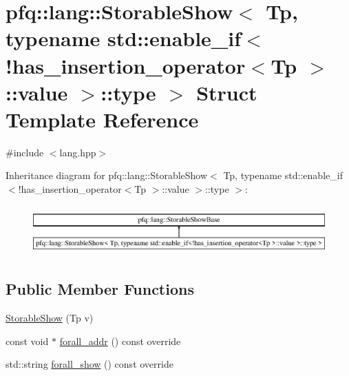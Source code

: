 \hypertarget{structpfq_1_1lang_1_1StorableShow_3_01Tp_00_01typename_01std_1_1enable__if_3_9has__insertion__op9c58e317fa180887b2f1b929c60377c7}{\section{pfq\+:\+:lang\+:\+:Storable\+Show$<$ Tp, typename std\+:\+:enable\+\_\+if$<$!has\+\_\+insertion\+\_\+operator$<$Tp $>$\+:\+:value $>$\+:\+:type $>$ Struct Template Reference}
\label{structpfq_1_1lang_1_1StorableShow_3_01Tp_00_01typename_01std_1_1enable__if_3_9has__insertion__op9c58e317fa180887b2f1b929c60377c7}
}


{\ttfamily \#include $<$lang.\+hpp$>$}

Inheritance diagram for pfq\+:\+:lang\+:\+:Storable\+Show$<$ Tp, typename std\+:\+:enable\+\_\+if$<$!has\+\_\+insertion\+\_\+operator$<$Tp $>$\+:\+:value $>$\+:\+:type $>$\+:\begin{figure}[H]
\begin{center}
\leavevmode
\includegraphics[height=1.921098cm]{structpfq_1_1lang_1_1StorableShow_3_01Tp_00_01typename_01std_1_1enable__if_3_9has__insertion__op9c58e317fa180887b2f1b929c60377c7}
\end{center}
\end{figure}
\subsection*{Public Member Functions}
\begin{DoxyCompactItemize}
\item 
\hyperlink{structpfq_1_1lang_1_1StorableShow_3_01Tp_00_01typename_01std_1_1enable__if_3_9has__insertion__op9c58e317fa180887b2f1b929c60377c7_aed1fcf27fd0e98913c6ca92adf75e15d}{Storable\+Show} (Tp v)
\item 
const void $\ast$ \hyperlink{structpfq_1_1lang_1_1StorableShow_3_01Tp_00_01typename_01std_1_1enable__if_3_9has__insertion__op9c58e317fa180887b2f1b929c60377c7_a033512488e9bbf5604714f7cf54012d2}{forall\+\_\+addr} () const override
\item 
std\+::string \hyperlink{structpfq_1_1lang_1_1StorableShow_3_01Tp_00_01typename_01std_1_1enable__if_3_9has__insertion__op9c58e317fa180887b2f1b929c60377c7_a85241b6fce1ce68edfe68dc6c9920ce2}{forall\+\_\+show} () const override
\end{DoxyCompactItemize}
